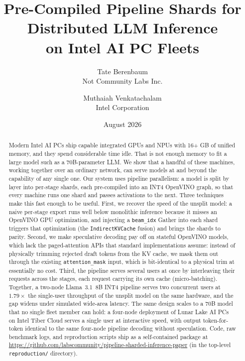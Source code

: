 \documentclass[11pt]{article}
\title{Pre-Compiled Pipeline Shards for Distributed LLM Inference\\on Intel AI PC Fleets}
\author{
  Tate Berenbaum \\
  Not Community Labs Inc.
  \and
  Muthaiah Venkatachalam \\
  Intel Corporation
}
\date{August 2026}
\newcommand{\brk}{\discretionary{}{}{}}
\begin{document}
\maketitle

\begin{abstract}
Modern Intel AI PCs ship capable integrated GPUs and NPUs with 16+ GB of unified memory, and they spend considerable time idle. That is not enough memory to fit a large model such as a 70B-parameter LLM. We show that a handful of these machines, working together over an ordinary network, can serve models at and beyond the capability of any single one. Our system uses pipeline parallelism: a model is split by layer into per-stage shards, each pre-compiled into an INT4 OpenVINO graph, so that every machine runs one shard and passes activations to the next. Three techniques make this fast enough to be useful. First, we recover the speed of the unsplit model: a naive per-stage export runs well below monolithic inference because it misses an OpenVINO GPU optimization, and injecting a \texttt{beam\_idx} Gather into each shard triggers that optimization (the \texttt{Indirect\brk KVCache} fusion) and brings the shards to parity. Second, we make speculative decoding pay off on stateful OpenVINO models, which lack the paged-attention APIs that standard implementations assume: instead of physically trimming rejected draft tokens from the KV cache, we mask them out through the existing \texttt{attention\_\brk mask} input, which is bit-identical to a physical trim at essentially no cost. Third, the pipeline serves several users at once by interleaving their requests across the stages, each request carrying its own cache (micro-batching). Together, a two-node Llama~3.1~8B INT4 pipeline serves two concurrent users at $1.79\times$ the single-user throughput of the unsplit model on the same hardware, and the gap widens under simulated wide-area latency. The same design scales to a 70B model that no single fleet member can hold: a four-node deployment of Lunar Lake AI PCs on Intel Tiber Cloud serves a single user at interactive speed, with output token-for-token identical to the same four-node pipeline decoding without speculation. Code, raw benchmark logs, and reproduction scripts ship as a self-contained package at \url{https://github.com/labscommunity/pipeline-sharded-inference-paper} (in the top-level \texttt{reproduction/} directory).
\end{abstract}

\end{document}

